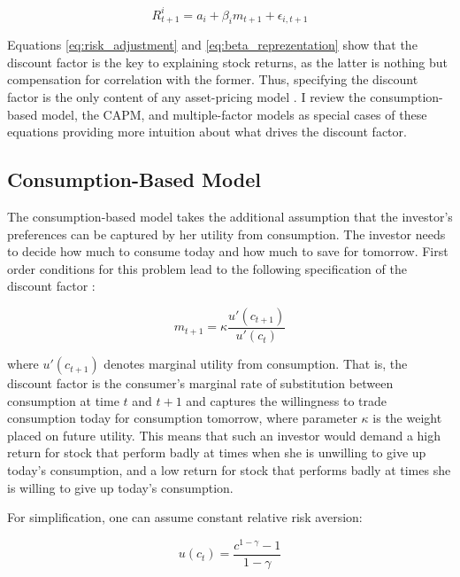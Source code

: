  		\begin{equation}
 		R_{t+1}^i = a_i + \beta_{i}m_{t+1} + \epsilon_{i,t+1}
 		\end{equation} 
 		
 		Equations \ref{eq:risk_adjustment} and \ref{eq:beta_reprezentation} show that the discount factor is the key to explaining stock returns, as the latter is nothing but compensation for correlation with the former. Thus, specifying the discount factor is the only content of any asset-pricing model \cite{cochrane2009asset}. I review the consumption-based model, the CAPM, and multiple-factor models as special cases of these equations providing more intuition about what drives the discount factor. 
 			 	
	 	\subsection{Consumption-Based Model}
	 	
		 	The consumption-based model takes the additional assumption that the investor's preferences can be captured by her utility from consumption. The investor needs to decide how much to consume today and how much to save for tomorrow. First order conditions for this problem lead to the following specification of the discount factor \cite{cochrane2009asset}: 
		 	
		 	\begin{equation}
		 		m_{t+1} = \kappa \frac{u'(c_{t+1})}{u'(c_t)} \label{consumtion_based_model}
		 	\end{equation}
		 	
		 	where $u'(c_{t+1})$ denotes marginal utility from consumption. That is, the discount factor is the consumer's  marginal rate of substitution between consumption at time $t$ and $t+1$ and captures the willingness to trade consumption today for consumption tomorrow, where parameter $\kappa$ is the weight placed on future utility. This means that such an investor would demand a high return for stock that perform badly at times when she is unwilling to give up today's consumption, and a low return for stock that performs badly at times she is willing to give up today's consumption. 
		 	
		 	For simplification, one can assume constant relative risk aversion:
		 	
		 	\begin{equation}
		 		u(c_t) = \frac{c^{1-\gamma}-1}{1-\gamma}
		 	\end{equation}
		 	
